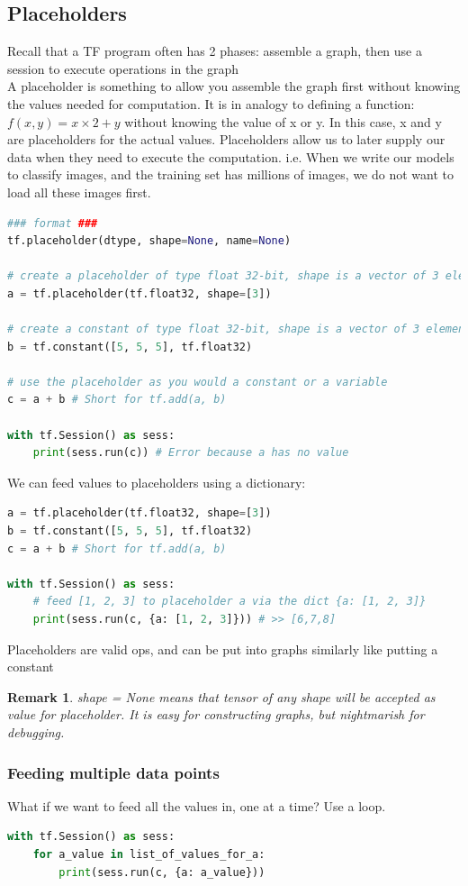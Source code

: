 \documentclass{article}
\newtheorem*{remark}{Remark}
\begin{document}
	\subsection{Placeholders}
	Recall that a TF program often has 2 phases: assemble a graph, then use a session to execute operations in the graph\\
	A placeholder is something to allow you assemble the graph first without knowing the values needed for computation. It is in analogy to defining a function: $f(x,y) = x\times2 + y$ without knowing the value of x or y. In this case, x and y are placeholders for the actual values.
	Placeholders allow us to later supply our data when they need to execute the computation. i.e. When we write our models to classify images, and the training set has millions of images, we do not want to load all these images first.
\begin{lstlisting}[language=Python,morekeywords ={as}]
### format ###
tf.placeholder(dtype, shape=None, name=None)

# create a placeholder of type float 32-bit, shape is a vector of 3 elements
a = tf.placeholder(tf.float32, shape=[3])

# create a constant of type float 32-bit, shape is a vector of 3 elements
b = tf.constant([5, 5, 5], tf.float32)

# use the placeholder as you would a constant or a variable
c = a + b # Short for tf.add(a, b)

with tf.Session() as sess:
	print(sess.run(c)) # Error because a has no value
\end{lstlisting}
We can feed values to placeholders using a dictionary:
\begin{lstlisting}[language=Python,morekeywords ={as}]
a = tf.placeholder(tf.float32, shape=[3])
b = tf.constant([5, 5, 5], tf.float32)
c = a + b # Short for tf.add(a, b)

with tf.Session() as sess:
	# feed [1, 2, 3] to placeholder a via the dict {a: [1, 2, 3]}
	print(sess.run(c, {a: [1, 2, 3]})) # >> [6,7,8] 
\end{lstlisting}
	Placeholders are valid ops, and can be put into graphs similarly like putting a constant
	\begin{remark}
		shape = None means that tensor of any shape will be accepted as value for placeholder. It is easy for constructing graphs, but nightmarish for debugging.
	\end{remark}
	\subsubsection{Feeding multiple data points}
	What if we want to feed all the values in, one at a time? Use a loop.
\begin{lstlisting}[language=Python,morekeywords ={as}]
with tf.Session() as sess:
	for a_value in list_of_values_for_a:
		print(sess.run(c, {a: a_value})) 
\end{lstlisting}	
\end{document}
